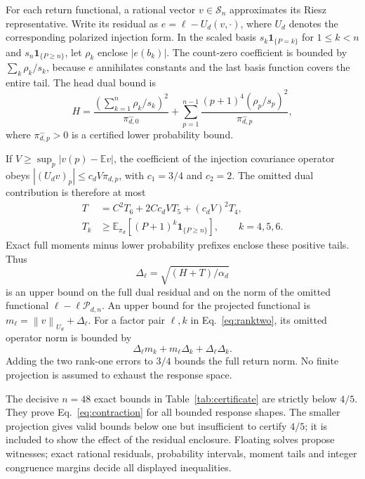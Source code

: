 \documentclass[11pt]{article}
\newcommand{\E}{\mathbb E}
\newcommand{\ind}{\mathbf 1}
\newcommand{\norm}[1]{\left\lVert #1\right\rVert}
\begin{document}
For each return functional, a rational vector $v\in\mathcal S_n$
approximates its Riesz representative. Write its residual as
$e=\ell-U_d(v,\cdot)$, where $U_d$ denotes the corresponding polarized
injection form. In the scaled basis
$s_k\ind_{\{P=k\}}$ for $1\leq k<n$ and
$s_n\ind_{\{P\geq n\}}$, let $\rho_k$ enclose $|e(b_k)|$.
The count-zero coefficient is bounded by $\sum_k\rho_k/s_k$,
because $e$ annihilates constants and the last basis function covers
the entire tail. The head dual bound is
\begin{equation}
 H=\frac{(\sum_{k=1}^n\rho_k/s_k)^2}{\pi_{d,0}^{-}}
    +\sum_{p=1}^{n-1}
       \frac{(p+1)^4(\rho_p/s_p)^2}{\pi_{d,p}^{-}},
 \label{eq:head}
\end{equation}
where $\pi_{d,p}^{-}>0$ is a certified lower probability bound.

If $V\geq\sup_p|v(p)-\E v|$, the coefficient of the injection
covariance operator obeys
$|(U_dv)_p|\leq c_dV\pi_{d,p}$, with $c_1=3/4$ and $c_2=2$.
The omitted dual contribution is therefore at most
\begin{align}
 T&=C^2T_6+2Cc_dVT_5+(c_dV)^2T_4,\nonumber\\
 T_k&\geq\E_{\pi_d}[(P+1)^k\ind_{\{P\geq n\}}],\qquad k=4,5,6.
 \label{eq:tail}
\end{align}
Exact full moments minus lower probability prefixes enclose these
positive tails. Thus
\begin{equation}
 \Delta_\ell=\sqrt{(H+T)/\alpha_d}
 \label{eq:rieszerror}
\end{equation}
is an upper bound on the full dual residual and on the norm of the
omitted functional $\ell-\ell\mathcal P_{d,n}$.
An upper bound for the projected functional is
$m_\ell=\norm v_{U_d}+\Delta_\ell$.
For a factor pair $\ell,k$ in Eq.~\eqref{eq:ranktwo}, its omitted
operator norm is bounded by
\begin{equation}
 \Delta_\ell m_k+m_\ell\Delta_k+\Delta_\ell\Delta_k.
 \label{eq:rankerror}
\end{equation}
Adding the two rank-one errors to $3/4$ bounds the full return norm.
No finite projection is assumed to exhaust the response space.



The decisive $n=48$ exact bounds in Table~\ref{tab:certificate} are
strictly below $4/5$. They prove Eq.~\eqref{eq:contraction} for all
bounded response shapes. The smaller projection gives valid bounds
below one but insufficient to certify $4/5$; it is included to show
the effect of the residual enclosure. Floating solves propose witnesses;
exact rational residuals, probability intervals, moment tails and integer
congruence margins decide all displayed inequalities.
\end{document}
